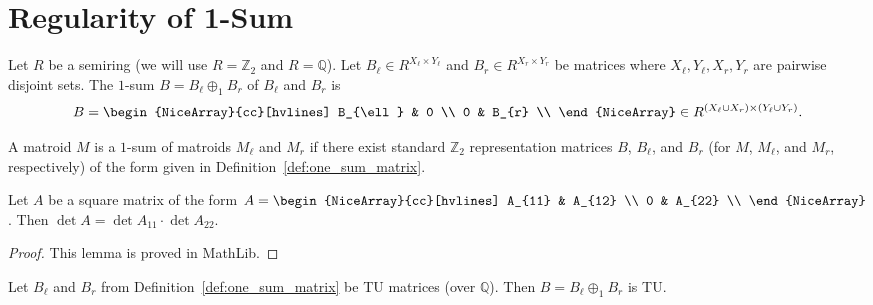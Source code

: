 \section{Regularity of 1-Sum}

\begin{definition}\label{def:one_sum_matrix}
    Let $R$ be a semiring (we will use $R = \mathbb{Z}_{2}$ and $R = \mathbb{Q}$). Let $B_{\ell} \in R^{X_{\ell} \times Y_{\ell}}$ and $B_{r} \in R^{X_{r} \times Y_{r}}$ be matrices where $X_{\ell}, Y_{\ell}, X_{r}, Y_{r}$ are pairwise disjoint sets. The $1$-sum $B = B_{\ell} \oplus_{1} B_{r}$ of $B_{\ell}$ and $B_{r}$ is
    \[
        B = \begin{NiceArray}{cc}[hvlines] B_{\ell} & 0 \\ 0 & B_{r} \\ \end{NiceArray} \in R^{(X_{\ell} \cup X_{r}) \times (Y_{\ell} \cup Y_{r})}.
    \]
\end{definition}

\begin{definition}\label{def:one_sum_matroid}
    A matroid $M$ is a $1$-sum of matroids $M_{\ell}$ and $M_{r}$ if there exist standard $\mathbb{Z}_{2}$ representation matrices $B$, $B_{\ell}$, and $B_{r}$ (for $M$, $M_{\ell}$, and $M_{r}$, respectively) of the form given in Definition~\ref{def:one_sum_matrix}.
\end{definition}

\begin{lemma}\label{lem:det_lower_left_zero}
    Let $A$ be a square matrix of the form $A = \begin{NiceArray}{cc}[hvlines] A_{11} & A_{12} \\ 0 & A_{22} \\ \end{NiceArray}$. Then $\det A = \det A_{11} \cdot \det A_{22}$.
\end{lemma}

\begin{proof}
    This lemma is proved in MathLib.
\end{proof}

\begin{lemma}\label{lem:one_sum_tu}
    Let $B_{\ell}$ and $B_{r}$ from Definition~\ref{def:one_sum_matrix} be TU matrices (over $\mathbb{Q}$). Then $B = B_{\ell} \oplus_{1} B_{r}$ is TU.
\end{lemma}


